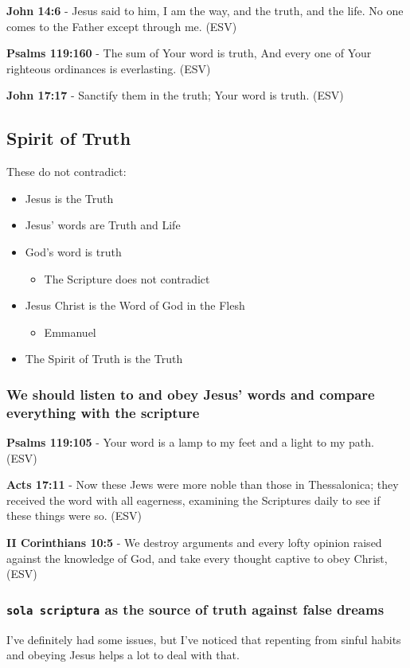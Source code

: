 \documentclass[11pt]{article}
\begin{document}
\textbf{John 14:6} - Jesus said to him, I am the way, and the truth, and the life. No one comes to the Father except through me. (ESV)

\textbf{Psalms 119:160} - The sum of Your word is truth, And every one of Your righteous ordinances is everlasting. (ESV)

\textbf{John 17:17} - Sanctify them in the truth; Your word is truth. (ESV)

\subsection{Spirit of Truth}
\label{sec:org97dcb8a}
These do not contradict:
\begin{itemize}
\item Jesus is the Truth
\item Jesus' words are Truth and Life
\item God's word is truth
\begin{itemize}
\item The Scripture does not contradict
\end{itemize}
\item Jesus Christ is the Word of God in the Flesh
\begin{itemize}
\item Emmanuel
\end{itemize}
\item The Spirit of Truth is the Truth
\end{itemize}

\subsubsection{We should listen to and obey Jesus' words and compare everything with the scripture}
\label{sec:orgb7d06aa}

\textbf{Psalms 119:105} - Your word is a lamp to my feet and a light to my path. (ESV)

\textbf{Acts 17:11} - Now these Jews were more noble than those in Thessalonica; they received the word with all eagerness, examining the Scriptures daily to see if these things were so. (ESV)

\textbf{II Corinthians 10:5} - We destroy arguments and every lofty opinion raised against the knowledge of God, and take every thought captive to obey Christ, (ESV)

\subsubsection{\texttt{sola scriptura} as the source of truth against false dreams}
\label{sec:org90f051f}
I've definitely had some issues, but I've noticed that repenting from sinful habits and obeying Jesus helps a lot to deal with that.
\end{document}
